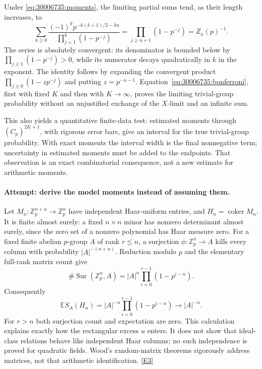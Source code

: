 \documentclass[11pt,a4paper]{article}
\newcommand{\Z}{\mathbb{Z}}
\newcommand{\E}{\mathbb{E}}
\newcommand{\eref}[2]{\hyperlink{extra:#1:#2}{[E#2]}}
\numberwithin{equation}{section}
\begin{document}
Under \eqref{eq:30006735:moments}, the limiting partial sums tend, as their
length increases, to
\begin{equation}\label{eq:30006735:euler}
 \sum_{k\geq0}
 \frac{(-1)^k p^{-k(k+1)/2-ku}}{\prod_{j=1}^k(1-p^{-j})}
 =\prod_{j\geq u+1}(1-p^{-j})=Z_u(p)^{-1}.
\end{equation}
The series is absolutely convergent: its denominator is bounded below by
$\prod_{j\geq1}(1-p^{-j})>0$, while its numerator decays quadratically in
$k$ in the exponent. The identity follows by expanding the convergent
product $\prod_{j\geq0}(1-zp^{-j})$ and putting $z=p^{-u-1}$.
Equation~\eqref{eq:30006735:bonferroni}, first with fixed $K$ and then with
$K\to\infty$, proves the limiting trivial-group probability without an
unjustified exchange of the $X$-limit and an infinite sum.

This also yields a quantitative finite-data test: estimated moments through
$(C_p)^{2K+1}$, with rigorous error bars, give an interval for the true
trivial-group probability. With exact moments the interval width is the final nonnegative term;
uncertainty in estimated moments must be added to the endpoints. That observation is an exact combinatorial consequence, not a
new estimate for arithmetic moments.

\paragraph{Attempt: derive the model moments instead of assuming them.}
Let $M_n:\Z_p^{n+u}\to\Z_p^n$ have independent Haar-uniform entries,
and $H_n=\operatorname{coker}M_n$. It is finite almost surely: a fixed
$n\times n$ minor has nonzero determinant almost surely, since the zero
set of a nonzero polynomial has Haar measure zero. For a fixed finite
abelian $p$-group $A$ of rank $r\leq n$, a surjection
$\phi:\Z_p^n\to A$ kills every column with probability
$|A|^{-(n+u)}$. Reduction modulo $p$ and the elementary full-rank matrix
count give
\[
 \#\operatorname{Sur}(\Z_p^n,A)
 =|A|^n\prod_{i=0}^{r-1}(1-p^{i-n}).
\]
Consequently
\begin{equation}\label{eq:30006735:Haar}
 \E S_A(H_n)=|A|^{-u}\prod_{i=0}^{r-1}(1-p^{i-n})
 \longrightarrow |A|^{-u}.
\end{equation}
For $r>n$ both surjection count and expectation are zero. This calculation
explains exactly how the rectangular excess $u$ enters. It does not show
that ideal-class relations behave like independent Haar columns; no
such independence is proved for quadratic fields. Wood's random-matrix
theorems rigorously address matrices, not that arithmetic identification.
\eref{30006735}{3}
\end{document}
